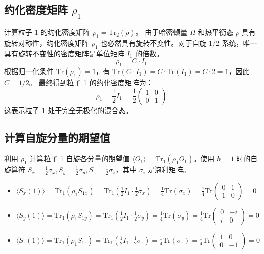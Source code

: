 \documentclass[12pt, a4paper]{article}
\begin{document}
\subsection*{约化密度矩阵 \(\rho_1\)}
计算粒子 1 的约化密度矩阵 \(\rho_1 = \text{Tr}_2(\rho)\)。
由于哈密顿量 \(H\) 和热平衡态 \(\rho\) 具有旋转对称性，约化密度矩阵 \(\rho_1\) 也必然具有旋转不变性。对于自旋 1/2 系统，唯一具有旋转不变性的密度矩阵是单位矩阵 \(I_1\) 的倍数。
\[ \rho_1 = C \cdot I_1 \]
根据归一化条件 \(\text{Tr}(\rho_1) = 1\)，有 \(\text{Tr}(C \cdot I_1) = C \cdot \text{Tr}(I_1) = C \cdot 2 = 1\)，因此 \(C = 1/2\)。
最终得到粒子 1 的约化密度矩阵为：
\[ \rho_1 = \frac{1}{2} I_1 = \frac{1}{2} \begin{pmatrix} 1 & 0 \\ 0 & 1 \end{pmatrix} \]
这表示粒子 1 处于完全无极化的混合态。
\subsection*{计算自旋分量的期望值}
利用 \(\rho_1\) 计算粒子 1 自旋各分量的期望值 \(\langle O_1 \rangle = \text{Tr}_1(\rho_1 O_1)\)。使用 \(\hbar = 1\) 时的自旋算符 \(S_x = \frac{1}{2}\sigma_x, S_y = \frac{1}{2}\sigma_y, S_z = \frac{1}{2}\sigma_z\)，其中 \(\sigma_i\) 是泡利矩阵。
\begin{itemize}
    \item \(\langle S_x(1) \rangle = \text{Tr}_1(\rho_1 S_{1x}) = \text{Tr}_1\left(\frac{1}{2} I_1 \cdot \frac{1}{2} \sigma_x\right) = \frac{1}{4} \text{Tr}(\sigma_x) = \frac{1}{4} \text{Tr}\begin{pmatrix} 0 & 1 \\ 1 & 0 \end{pmatrix} = 0\)
    \item \(\langle S_y(1) \rangle = \text{Tr}_1(\rho_1 S_{1y}) = \text{Tr}_1\left(\frac{1}{2} I_1 \cdot \frac{1}{2} \sigma_y\right) = \frac{1}{4} \text{Tr}(\sigma_y) = \frac{1}{4} \text{Tr}\begin{pmatrix} 0 & -i \\ i & 0 \end{pmatrix} = 0\)
    \item \(\langle S_z(1) \rangle = \text{Tr}_1(\rho_1 S_{1z}) = \text{Tr}_1\left(\frac{1}{2} I_1 \cdot \frac{1}{2} \sigma_z\right) = \frac{1}{4} \text{Tr}(\sigma_z) = \frac{1}{4} \text{Tr}\begin{pmatrix} 1 & 0 \\ 0 & -1 \end{pmatrix} = 0\)
\end{itemize}
\end{document}
